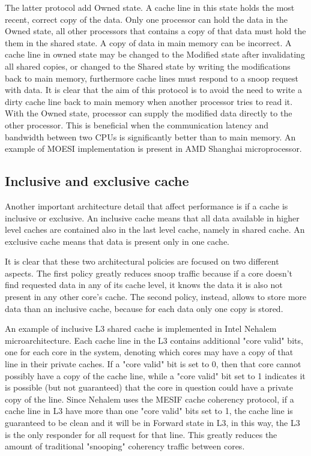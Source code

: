 The latter protocol add Owned state. A cache line in this state holds the most recent, correct copy of the data. Only one processor can hold the data 
in the Owned state, all other processors that contains a copy of that data must hold the them in the shared state. A copy of data in main memory can be 
incorrect. A cache line in owned state may be changed to the Modified state after invalidating all shared copies, or changed to the Shared state by 
writing the modifications back to main memory, furthermore cache lines must respond to a snoop request with data. 
It is clear that the aim of this protocol is to avoid the need to write a dirty cache line back to main memory when another processor tries to read it. 
With the Owned state, processor can supply the modified data directly to the other processor. This is beneficial when the communication latency and 
bandwidth between two CPUs is significantly better than to main memory. An example of MOESI implementation is present in AMD Shanghai microprocessor.

\subsection{Inclusive and exclusive cache}

Another important architecture detail that affect performance is if a cache is inclusive or exclusive.
An inclusive cache means that all data available in higher level caches are contained also in the last level cache, namely in shared cache.
An exclusive cache means that data is present only in one cache.

It is clear that these two architectural policies are focused on two different aspects. The first policy greatly reduces snoop traffic because if a core 
doesn't find requested data in any of its cache level, it knows the data it is also not present in any other core's cache. The second policy, instead, 
allows to store more data than an inclusive cache, because for each data only one copy is stored.

An example of inclusive L3 shared cache is implemented in Intel Nehalem microarchitecture. Each cache line in the L3 contains additional "core valid" bits,
one for each core in the system, denoting which cores may have a copy of that line in their private caches. If a "core valid" bit is set to 0, then that 
core cannot possibly have a copy of the cache line, while a "core valid" bit set to 1 indicates it is possible (but not guaranteed) that the core in 
question could have a private copy of the line. Since Nehalem uses the MESIF cache coherency protocol, if a cache line in L3 have more than one 
"core valid" bits set to 1, the cache line is guaranteed to be clean and it will be in Forward state in L3, in this way, the L3 is the only
responder for all request for that line. This greatly reduces the amount of traditional "snooping" coherency traffic between cores.

